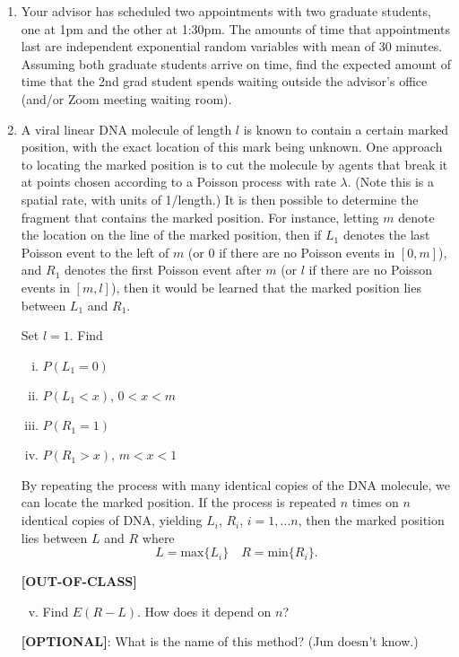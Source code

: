 \documentclass[12pt,letterpaper]{article}
\begin{document}
\begin{enumerate}


\item Your advisor has scheduled two appointments with two graduate students, one at 1pm and the other at 1:30pm. The amounts of time that appointments last are independent exponential random variables with mean of 30 minutes. Assuming both graduate students arrive on time, find the expected amount of time that the 2nd grad student spends waiting outside the advisor's office (and/or Zoom meeting waiting room).


\item A viral linear DNA molecule of length $l$ is known to contain a certain marked position, with the exact location of this mark being unknown. One approach to locating the marked position is to cut the molecule by agents that break it at points chosen according to a Poisson process with rate $\lambda$. (Note this is a spatial rate, with units of 1/length.) It is then possible to determine the fragment that contains the marked position. For instance, letting $m$ denote the location on the line of the marked position, then if $L_1$ denotes the last Poisson event to the left of $m$ (or $0$ if there are no Poisson events in $[0,m]$), and $R_1$ denotes the first Poisson event after $m$ (or $l$ if there are no Poisson events in $[m,l]$), then it would be learned that the marked position lies between $L_1$ and $R_1$.

Set $l=1$. Find
\begin{enumerate}[i.]
\item $P(L_1=0)$
\item $P(L_1<x)$, $0<x<m$
\item $P(R_1=1)$
\item $P(R_1> x)$, $m<x<1$
\end{enumerate}
By repeating the process with many identical copies of the DNA molecule, we can locate the marked position. If the process is repeated $n$ times on $n$ identical copies of DNA, yielding $L_i$, $R_i$, $i=1,...n$, then the marked position lies between $L$ and $R$ where
\begin{equation}
L = \mbox{max}\{L_i\} \quad R = \mbox{min}\{R_i\}.
\end{equation}

\textbf{[OUT-OF-CLASS]}
\begin{enumerate}[i.]
  \setcounter{enumii}{4}
\item Find $E(R-L)$. How does it depend on $n$?
\end{enumerate}

\textbf{[OPTIONAL]}: What is the name of this method? (Jun doesn't know.)




\end{enumerate}
\end{document}
